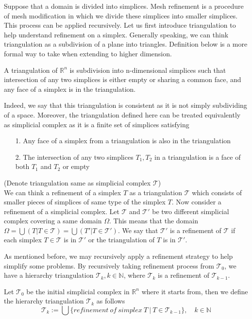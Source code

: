 Suppose that a domain is divided into simplices. Mesh refinement is a procedure of mesh modification in which we divide these simplices into smaller simplices. This process can be applied recursively. Let us first introduce triangulation to help understand refinement on a simplex. Generally speaking, we can think triangulation as a subdivision of a plane into triangles. Definition below is a more formal way to take when extending to higher dimension.
    \begin{definition*}
    A triangulation of $\mathbb R^n$ is subdivision into n-dimensional simplices such that intersection of any two simplices is either empty or sharing a common face, and any face of a simplex is in the triangulation.
    \end{definition*}
    Indeed, we say that this triangulation is consistent as it is not simply subdividing of a space. Moreover, the triangulation defined here can be treated equivalently as simplicial complex as it is a finite set of simplices satisfying
    \begin{itemize}
        \item[1.] Any face of a simplex from a triangulation is also in the triangulation
        \item[2.] The intersection of any two simplices $T_1, T_2 $ in a triangulation is a face of both $T_1$ and  $T_2$ or empty
    \end{itemize}
    (Denote triangulation same as simplicial complex $\mathcal{T}$)\\
    

    We can think a refinement of a simplex $T$ as a triangulation $\mathcal{T}$ which consists of smaller pieces of simplices of same type of the simplex $T$. Now consider a refinement of a simplicial complex. Let $\mathcal{T}$ and $\mathcal{T'}$ be two different simplicial complex covering a same domain $\Omega$. This means that the domain \(\Omega = \displaystyle \bigcup({T \vert T\in \mathcal{T}}) = \bigcup({T' \vert T\in \mathcal{T'}})\). We say that $\mathcal{T'}$ is a refinement of $\mathcal{T}$ if each simplex $T\in\mathcal{T}$ is in $\mathcal{T'}$ or the triangulation of $T$ is in $\mathcal{T'}$.

    As mentioned before, we may recursively apply a refinement strategy to help simplify some problems. By recursively taking refinement process from $\mathcal{T}_0$, we have a hierarchy triangulation $\mathcal{T}_k, k\in\mathbb{N}$, where $\mathcal{T}_k$ is a refinement of $\mathcal{T}_{k-1}$. 
    \begin{definition*}
    Let $\mathcal{T}_0$ be the initial simplicial complex in $\mathbb{R}^n$ where it starts from, then we define the hierarchy triangulation $\mathcal{T}_k$ as follows
    \begin{equation*}
    \mathcal{T}_k := \bigcup\{refinement~of~simplex~T ~\vert ~T\in\mathcal{T}_{k-1}\}, \quad k\in\mathbb{N}
    \end{equation*}
    \end{definition*}

